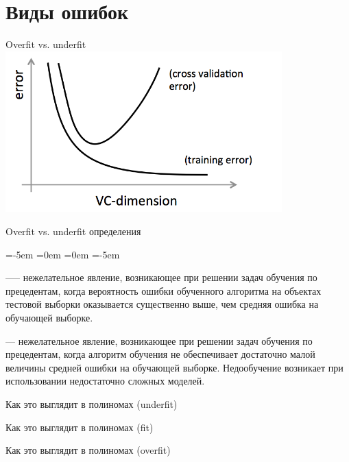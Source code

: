\documentclass[14pt, fleqn, xcolor={dvipsnames, table}]{beamer}
\begin{document}
\section{Виды ошибок}
\begin{frame}{Overfit vs. underfit}
\centering
\includegraphics[width=0.8\textwidth]{overfit_underfit.png} 
\end{frame}

\begin{frame}{Overfit vs. underfit определения}
\begin{description}
\leftmargin=-5em
\itemindent=0em
=0em
\leftskip=-5em
  \item[Переобучение, переподгонка (overtraining, overfitting)] —-- нежелательное явление, возникающее при решении задач обучения по прецедентам, когда вероятность ошибки обученного алгоритма на объектах тестовой выборки оказывается существенно выше, чем средняя ошибка на обучающей выборке. 
  \item[Недообучение (underfitting)] --- нежелательное явление, возникающее при решении задач обучения по прецедентам, когда алгоритм обучения не обеспечивает достаточно малой величины средней ошибки на обучающей выборке. Недообучение возникает при использовании недостаточно сложных моделей.
\end{description}
\end{frame}

\begin{frame}{Как это выглядит в полиномах (underfit)}
\end{frame}

\begin{frame}{Как это выглядит в полиномах (fit)}
\end{frame}

\begin{frame}{Как это выглядит в полиномах (overfit)}
\end{frame}
\end{document}
